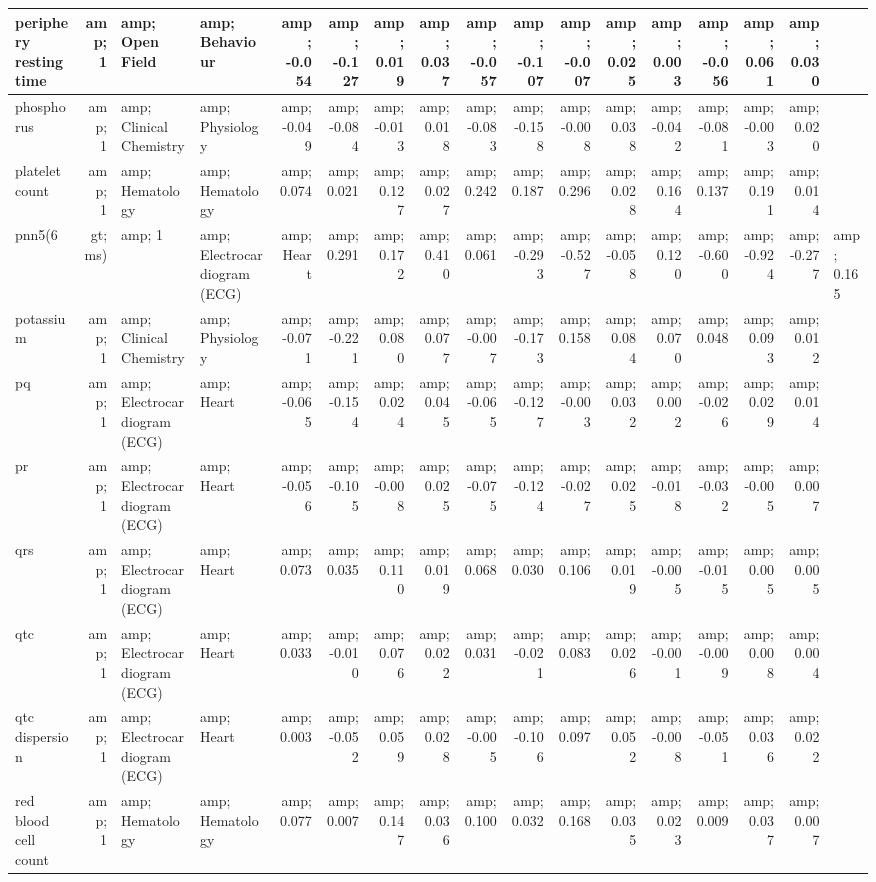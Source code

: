 \documentclass[]{article}
\begin{document}
\begin{table}
\begin{tabular}[t]{l|r|l|l|r|r|r|r|r|r|r|r|r|r|r|r}
\hline
periphery resting time &amp; 1 &amp; Open Field &amp; Behaviour &amp; -0.054 &amp; -0.127 &amp; 0.019 &amp; 0.037 &amp; -0.057 &amp; -0.107 &amp; -0.007 &amp; 0.025 &amp; 0.003 &amp; -0.056 &amp; 0.061 &amp; 0.030\\
\hline
phosphorus &amp; 1 &amp; Clinical Chemistry &amp; Physiology &amp; -0.049 &amp; -0.084 &amp; -0.013 &amp; 0.018 &amp; -0.083 &amp; -0.158 &amp; -0.008 &amp; 0.038 &amp; -0.042 &amp; -0.081 &amp; -0.003 &amp; 0.020\\
\hline
platelet count &amp; 1 &amp; Hematology &amp; Hematology &amp; 0.074 &amp; 0.021 &amp; 0.127 &amp; 0.027 &amp; 0.242 &amp; 0.187 &amp; 0.296 &amp; 0.028 &amp; 0.164 &amp; 0.137 &amp; 0.191 &amp; 0.014\\
\hline
pnn5(6&gt;ms) &amp; 1 &amp; Electrocardiogram (ECG) &amp; Heart &amp; 0.291 &amp; 0.172 &amp; 0.410 &amp; 0.061 &amp; -0.293 &amp; -0.527 &amp; -0.058 &amp; 0.120 &amp; -0.600 &amp; -0.924 &amp; -0.277 &amp; 0.165\\
\hline
potassium &amp; 1 &amp; Clinical Chemistry &amp; Physiology &amp; -0.071 &amp; -0.221 &amp; 0.080 &amp; 0.077 &amp; -0.007 &amp; -0.173 &amp; 0.158 &amp; 0.084 &amp; 0.070 &amp; 0.048 &amp; 0.093 &amp; 0.012\\
\hline
pq &amp; 1 &amp; Electrocardiogram (ECG) &amp; Heart &amp; -0.065 &amp; -0.154 &amp; 0.024 &amp; 0.045 &amp; -0.065 &amp; -0.127 &amp; -0.003 &amp; 0.032 &amp; 0.002 &amp; -0.026 &amp; 0.029 &amp; 0.014\\
\hline
pr &amp; 1 &amp; Electrocardiogram (ECG) &amp; Heart &amp; -0.056 &amp; -0.105 &amp; -0.008 &amp; 0.025 &amp; -0.075 &amp; -0.124 &amp; -0.027 &amp; 0.025 &amp; -0.018 &amp; -0.032 &amp; -0.005 &amp; 0.007\\
\hline
qrs &amp; 1 &amp; Electrocardiogram (ECG) &amp; Heart &amp; 0.073 &amp; 0.035 &amp; 0.110 &amp; 0.019 &amp; 0.068 &amp; 0.030 &amp; 0.106 &amp; 0.019 &amp; -0.005 &amp; -0.015 &amp; 0.005 &amp; 0.005\\
\hline
qtc &amp; 1 &amp; Electrocardiogram (ECG) &amp; Heart &amp; 0.033 &amp; -0.010 &amp; 0.076 &amp; 0.022 &amp; 0.031 &amp; -0.021 &amp; 0.083 &amp; 0.026 &amp; -0.001 &amp; -0.009 &amp; 0.008 &amp; 0.004\\
\hline
qtc dispersion &amp; 1 &amp; Electrocardiogram (ECG) &amp; Heart &amp; 0.003 &amp; -0.052 &amp; 0.059 &amp; 0.028 &amp; -0.005 &amp; -0.106 &amp; 0.097 &amp; 0.052 &amp; -0.008 &amp; -0.051 &amp; 0.036 &amp; 0.022\\
\hline
red blood cell count &amp; 1 &amp; Hematology &amp; Hematology &amp; 0.077 &amp; 0.007 &amp; 0.147 &amp; 0.036 &amp; 0.100 &amp; 0.032 &amp; 0.168 &amp; 0.035 &amp; 0.023 &amp; 0.009 &amp; 0.037 &amp; 0.007\\

\end{tabular}
\end{table}
\end{document}
